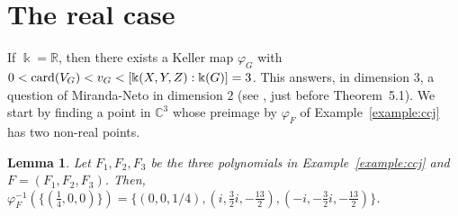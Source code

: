 \documentclass[11pt,reqno]{amsart}
\newtheorem{lemma}[theorem]{Lemma}
\theoremstyle{definition}
\newcommand{\mbk}{\mbox{$\Bbbk$}}
\newcommand{\mbc}{\mbox{$\mathbb{C}$}}
\newcommand{\mbr}{\mbox{$\mathbb{R}$}}
\newcommand{\card}{\mbox{${\rm card}$}}
\begin{document}
\section{The real case}

If $\mbk=\mbr$, then there exists a Keller map $\varphi_G$ with
$0<\card(V_G)<v_G<[\mbk(X,Y,Z):\mbk(G)]=3$. This answers, in dimension $3$, a question of Miranda-Neto in dimension $2$ (see \cite{mn}, just before Theorem~5.1). We start by finding a point in $\mbc^3$ whose preimage by $\varphi_F$ of Example~\ref{example:ccj} has two non-real points.

\begin{lemma}\label{lem:2max}
Let $F_1,F_2,F_3$ be the three polynomials in {\rm Example~\ref{example:ccj}} and $F=(F_1,F_2,F_3)$.
Then, $\varphi_F^{-1}(\{(\frac{1}{4},0,0)\})=
\{(0,0,1/4),(i,\tfrac{3}{2}i,-\tfrac{13}{2}),(-i,-\tfrac{3}{2}i,-\tfrac{13}{2})\}$.
\end{lemma}
\end{document}
